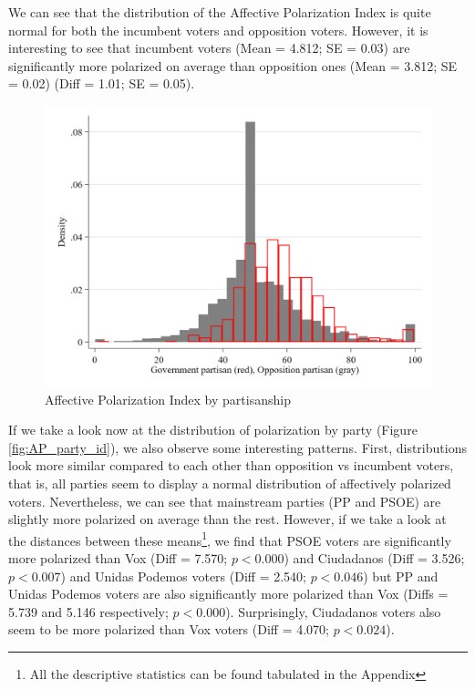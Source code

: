 \documentclass[a4paper, svgnames]{article}
\begin{document}
We can see that the distribution of the Affective Polarization Index is quite normal for both the incumbent voters and opposition voters. However, it is interesting to see that incumbent voters (Mean = 4.812; SE = 0.03) are significantly more polarized on average than opposition ones (Mean = 3.812; SE = 0.02) (Diff = 1.01; SE = 0.05).

\begin{figure}[H]
	\centering
	\includegraphics[scale=0.25]{Figures/AP_index_by_partisanship.png}
	\caption{\label{fig:AP_partisan} Affective Polarization Index by partisanship}
\end{figure}

If we take a look now at the distribution of polarization by party (Figure \ref*{fig:AP_party_id}), we also observe some interesting patterns. First, distributions look more similar compared to each other than opposition vs incumbent voters, that is, all parties seem to display a normal distribution of affectively polarized voters. Nevertheless, we can see that mainstream parties (PP and PSOE) are slightly more polarized on average than the rest. However, if we take a look at the distances between these means\footnote{All the descriptive statistics can be found tabulated in the Appendix}, we find that PSOE voters are significantly more polarized than Vox (Diff = 7.570; $p < 0.000$) and Ciudadanos (Diff = 3.526; $p < 0.007$) and  Unidas Podemos voters (Diff = 2.540; $p < 0.046$) but PP and Unidas Podemos voters are also significantly more polarized than Vox (Diffs = 5.739 and 5.146 respectively; $p<0.000$). Surprisingly, Ciudadanos voters also seem to be more polarized than Vox voters (Diff = 4.070; $p<0.024$).
\end{document}
